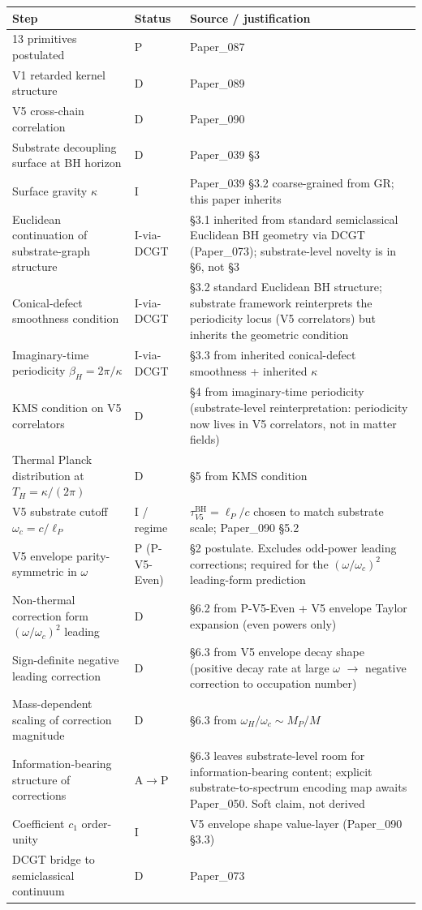 \documentclass[11pt,a4paper]{article}
\begin{document}
{\footnotesize
\begin{longtable}{p{}p{}p{}}
\toprule
\textbf{Step} & \textbf{Status} & \textbf{Source / justification} \\
\midrule
\endhead
13 primitives postulated & P & Paper\_087 \\
V1 retarded kernel structure & D & Paper\_089 \\
V5 cross-chain correlation & D & Paper\_090 \\
Substrate decoupling surface at BH horizon & D & Paper\_039 \S3 \\
Surface gravity $\kappa$ & I & Paper\_039 \S3.2 coarse-grained from GR; this paper inherits \\
Euclidean continuation of substrate-graph structure & I-via-DCGT & \S3.1 inherited from standard semiclassical Euclidean BH geometry via DCGT (Paper\_073); substrate-level novelty is in \S6, not \S3 \\
Conical-defect smoothness condition & I-via-DCGT & \S3.2 standard Euclidean BH structure; substrate framework reinterprets the periodicity locus (V5 correlators) but inherits the geometric condition \\
Imaginary-time periodicity $\beta_H = 2\pi/\kappa$ & I-via-DCGT & \S3.3 from inherited conical-defect smoothness + inherited $\kappa$ \\
KMS condition on V5 correlators & D & \S4 from imaginary-time periodicity (substrate-level reinterpretation: periodicity now lives in V5 correlators, not in matter fields) \\
Thermal Planck distribution at $T_H = \kappa/(2\pi)$ & D & \S5 from KMS condition \\
V5 substrate cutoff $\omega_c = c/\ell_P$ & I / regime & $\tau_{V5}^\mathrm{BH} = \ell_P/c$ chosen to match substrate scale; Paper\_090 \S5.2 \\
V5 envelope parity-symmetric in $\omega$ & P (P-V5-Even) & \S2 postulate. Excludes odd-power leading corrections; required for the $(\omega/\omega_c)^2$ leading-form prediction \\
Non-thermal correction form $(\omega/\omega_c)^2$ leading & D & \S6.2 from P-V5-Even + V5 envelope Taylor expansion (even powers only) \\
Sign-definite negative leading correction & D & \S6.3 from V5 envelope decay shape (positive decay rate at large $\omega$ $\to$ negative correction to occupation number) \\
Mass-dependent scaling of correction magnitude & D & \S6.3 from $\omega_H/\omega_c \sim M_P/M$ \\
Information-bearing structure of corrections & A$\to$P & \S6.3 leaves substrate-level room for information-bearing content; explicit substrate-to-spectrum encoding map awaits Paper\_050. Soft claim, not derived \\
Coefficient $c_1$ order-unity & I & V5 envelope shape value-layer (Paper\_090 \S3.3) \\
DCGT bridge to semiclassical continuum & D & Paper\_073 \\
\bottomrule
\end{longtable}
}
\end{document}
